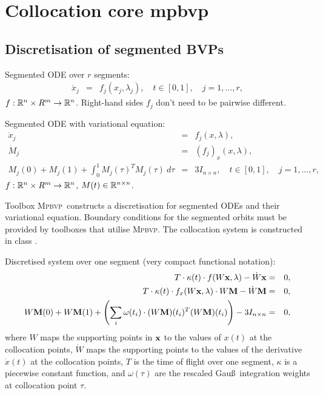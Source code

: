 \newcommand{\mpbvp}{{\scshape Mpbvp}}

\section{Collocation core mpbvp}

\subsection{Discretisation of segmented BVPs}

Segmented ODE over $r$ segments:
%
\begin{eqnarray*}
\dot{x}_j & = & f_j(x_j,\lambda_j), \quad t\in[0,1], \quad j=1,\dots,r,
\end{eqnarray*}
%
$f:{\mathbb R}^n\times R^m\to{\mathbb R}^n$. Right-hand sides $f_j$ don't need to be pairwise different. 


Segmented ODE with variational equation:
%
\begin{eqnarray*}
\dot{x}_j & = & f_j(x,\lambda), \\
\dot{M}_j & = & \left(f_j\right)_x(x,\lambda), \\
M_j(0) + M_j(1) + \int_{0}^{1} M_j(\tau)^T M_j(\tau) \: d\tau
	& = & 3 I_{n\times n}, \quad t\in[0,1], \quad j=1,\dots,r,
\end{eqnarray*}
%
$f:{\mathbb R}^n\times R^m\to{\mathbb R}^n$, $M(t)\in{\mathbb R}^{n\times n}$.

Toolbox \mpbvp\ constructs a discretisation for segmented ODEs and their variational equation. Boundary conditions for the segmented orbits must be provided by toolboxes that utilise \mpbvp. The collocation system is constructed in class .

Discretised system over one segment (very compact functional notation):
%
\begin{eqnarray*}
T \cdot \kappa(t) \cdot f(W\mathbf{x},\lambda) - \dot{W}\mathbf{x} & = & 0, \\
T \cdot \kappa(t) \cdot f_x(W\mathbf{x},\lambda)\cdot W\mathbf{M} - \dot{W}\mathbf{M} & = & 0, \\
W\mathbf{M}(0) + W\mathbf{M}(1) + \left(\sum_{i} \omega(t_i) \cdot
	(W\mathbf{M})(t_i)^T (W\mathbf{M})(t_i)\right) - 3 I_{n\times n}
	& = & 0,
\end{eqnarray*}
%
where $W$ maps the supporting points in $\mathbf{x}$ to the values of $x(t)$ at the collocation points, $\dot{W}$ maps the supporting points to the values of the derivative $\dot{x}(t)$ at the collocation points, $T$ is the time of flight over one segment, $\kappa$ is a piecewise constant function, and $\omega(\tau)$ are the rescaled Gau\ss\ integration weights at collocation point $\tau$.

